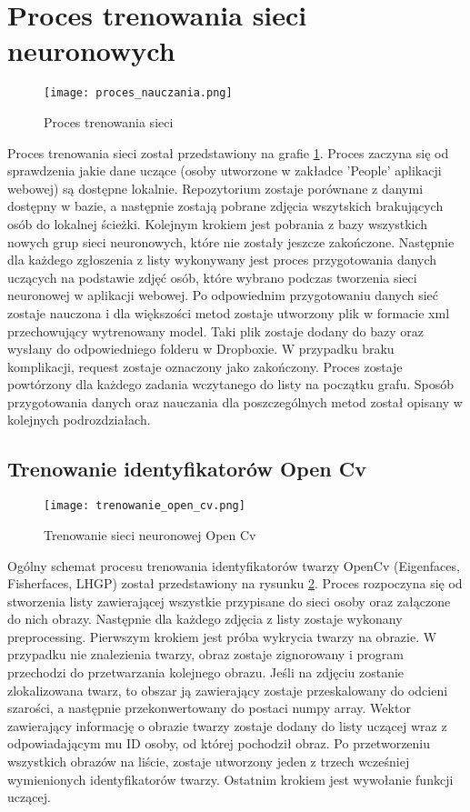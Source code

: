 \section{Proces trenowania sieci neuronowych}
\begin{figure}[H]
	\centering
	\texttt{[image: proces\_nauczania.png]}
	\caption{Proces trenowania sieci}
	\label{fig:trenowanie_proces}
\end{figure}
Proces trenowania sieci został przedstawiony na grafie \ref{fig:trenowanie_proces}. Proces zaczyna się od sprawdzenia jakie dane uczące (osoby utworzone w zakładce 'People' aplikacji webowej) są dostępne lokalnie. Repozytorium zostaje porównane z danymi dostępny w bazie, a następnie zostają pobrane zdjęcia wszytskich brakujących osób do lokalnej ścieżki. Kolejnym krokiem jest pobrania z bazy wszystkich nowych grup sieci neuronowych, które nie zostały jeszcze zakończone. Następnie dla każdego zgłoszenia z listy wykonywany jest proces przygotowania danych uczących na podstawie zdjęć osób, które wybrano podczas tworzenia sieci neuronowej w aplikacji webowej. Po odpowiednim przygotowaniu danych sieć zostaje nauczona i dla większości metod zostaje utworzony plik w formacie xml przechowujący wytrenowany model. Taki plik zostaje dodany do bazy oraz wysłany do odpowiedniego folderu w Dropboxie. W przypadku braku komplikacji, request zostaje oznaczony jako zakończony. Proces zostaje powtórzony dla każdego zadania wczytanego do listy na początku grafu. Sposób przygotowania danych oraz nauczania dla poszczególnych metod został opisany w kolejnych podrozdziałach.

\subsection{Trenowanie identyfikatorów Open Cv} \label{trenowanie_open_cv}
\begin{figure}[H]
	\centering
	\texttt{[image: trenowanie\_open\_cv.png]}
	\caption{Trenowanie sieci neuronowej Open Cv}
	\label{fig:trenowanie_open_cv}
\end{figure}
Ogólny schemat procesu trenowania identyfikatorów twarzy OpenCv (Eigenfaces, Fisherfaces, LHGP) został przedstawiony na rysunku \ref{fig:trenowanie_open_cv}. Proces rozpoczyna się od stworzenia listy zawierającej wszystkie przypisane do sieci osoby oraz załączone do nich obrazy. Następnie dla każdego zdjęcia z listy zostaje wykonany preprocessing. Pierwszym krokiem jest próba wykrycia twarzy na obrazie. W przypadku nie znalezienia twarzy, obraz zostaje zignorowany i program przechodzi do przetwarzania kolejnego obrazu. Jeśli na zdjęciu zostanie zlokalizowana twarz, to obszar ją zawierający zostaje przeskalowany do odcieni szarości, a następnie przekonwertowany do postaci numpy array. Wektor zawierający informację o obrazie twarzy zostaje dodany do listy uczącej wraz z odpowiadającym mu ID osoby, od której pochodził obraz. Po przetworzeniu wszystkich obrazów na liście, zostaje utworzony jeden z trzech wcześniej wymienionych identyfikatorów twarzy. Ostatnim krokiem jest wywołanie funkcji uczącej.

